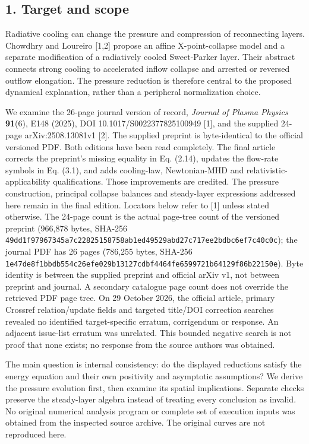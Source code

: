 \subsection{1. Target and scope}\label{target-and-scope}

Radiative cooling can change the pressure and compression of
reconnecting layers. Chowdhry and Loureiro {[}1,2{]} propose an affine
X-point-collapse model and a separate modification of a radiatively
cooled Sweet-Parker layer. Their abstract connects strong cooling to
accelerated inflow collapse and arrested or reversed outflow elongation.
The pressure reduction is therefore central to the proposed dynamical
explanation, rather than a peripheral normalization choice.

We examine the 26-page journal version of record, \emph{Journal of
Plasma Physics} \textbf{91}(6), E148 (2025), DOI
10.1017/S0022377825100949 {[}1{]}, and the supplied 24-page
arXiv:2508.13081v1 {[}2{]}. The supplied preprint is byte-identical to
the official versioned PDF. Both editions have been read completely. The
final article corrects the preprint's missing equality in Eq. (2.14),
updates the flow-rate symbols in Eq. (3.1), and adds cooling-law,
Newtonian-MHD and relativistic-applicability qualifications. Those
improvements are credited. The pressure construction, principal collapse
balances and steady-layer expressions addressed here remain in the final
edition. Locators below refer to {[}1{]} unless stated otherwise. The
24-page count is the actual page-tree count of the versioned preprint
(966,878 bytes, SHA-256
\nolinkurl{49dd1f97967345a7c22825158758ab1ed49529abd27c717ee2bdbc6ef7c40c0c});
the journal PDF has 26 pages (786,255 bytes, SHA-256
\nolinkurl{1e47de8f1bbdb554c26efe029b13127cdbf4464fe6599721b64129f86b22150e}).
Byte identity is between the supplied preprint and official arXiv v1,
not between preprint and journal. A secondary catalogue page count does
not override the retrieved PDF page tree. On 29 October 2026, the
official article, primary Crossref relation/update fields and targeted
title/DOI correction searches revealed no identified target-specific
erratum, corrigendum or response. An adjacent issue-list erratum was
unrelated. This bounded negative search is not proof that none exists;
no response from the source authors was obtained.

The main question is internal consistency: do the displayed reductions
satisfy the energy equation and their own positivity and asymptotic
assumptions? We derive the pressure evolution first, then examine its
spatial implications. Separate checks preserve the steady-layer algebra
instead of treating every conclusion as invalid. No original numerical
analysis program or complete set of execution inputs was obtained from
the inspected source archive. The original curves are not reproduced
here.

